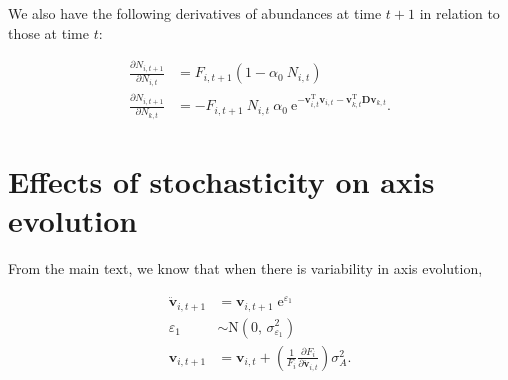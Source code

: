 We also have the following derivatives of abundances at time $t+1$ in relation
to those at time $t$:

\begin{equation*}
\begin{split}
    \frac{ \partial N_{i,t+1} }{ \partial N_{i,t} } &= 
        F_{i,t+1}
        \left(
            1 - \alpha_0 \: N_{i,t} 
        \right) \\
    \frac{ \partial N_{i,t+1} }{ \partial N_{k,t} } &= 
        - F_{i,t+1} \: N_{i,t} \: \alpha_0 \: 
        \text{e}^{ -\mathbf{v}_{i,t}^{\text{T}} \mathbf{v}_{i,t} -
            \mathbf{v}_{k,t}^{\text{T}} \mathbf{D} \mathbf{v}_{k,t} } 
    \textrm{.}
\end{split}
\end{equation*}













\section*{Effects of stochasticity on axis evolution}

From the main text, we know that when there is variability in axis evolution, 

\begin{equation*}
\begin{split}
    \mathbf{\ddot{v}}_{i,t+1} &= \mathbf{v}_{i,t+1} \; \text{e}^{\varepsilon_1} \\
    \varepsilon_1 &\sim \text{N}(0, \, \sigma^2_{\varepsilon_1}) \\
    \mathbf{v}_{i,t+1} &= \mathbf{v}_{i,t} + \left( \frac{1}{F_i}
        \frac{\partial F_i}{\partial \mathbf{\ddot{v}}_{i,t}} \right) \sigma_A^2
    \text{.}
\end{split}
\end{equation*}



